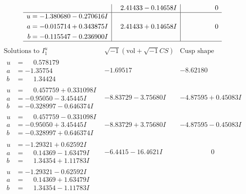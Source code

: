 \documentclass[1p]{elsarticle_modified}
\theoremstyle{definition}
\newcommand{\I}{\sqrt{-1}}
\begin{document}
$$\begin{array}{c|c|c}
 & \phantom{-}2.41433 - 0.14658 I & \phantom{-0.000000 } 0 \\ \hline\begin{aligned}
u &= -1.380680 - 0.270616 I \\
a &= -0.015714 + 0.343875 I \\
b &= -0.115547 - 0.236900 I\end{aligned}
 & \phantom{-}2.41433 + 0.14658 I & \phantom{-0.000000 } 0\\
 \hline 
 \end{array}$$\newpage$$\begin{array}{c|c|c}  
\text{Solutions to }I^u_{1}& \I (\text{vol} + \sqrt{-1}CS) & \text{Cusp shape}\\
 \hline 
\begin{aligned}
u &= \phantom{-}0.578179\phantom{ +0.000000I} \\
a &= -1.35754\phantom{ +0.000000I} \\
b &= \phantom{-}1.34424\phantom{ +0.000000I}\end{aligned}
 & -1.69517\phantom{ +0.000000I} & -8.62180\phantom{ +0.000000I} \\ \hline\begin{aligned}
u &= \phantom{-}0.457759 + 0.331098 I \\
a &= -0.95050 - 3.45445 I \\
b &= -0.328997 - 0.646374 I\end{aligned}
 & -8.83729 - 3.75680 I & -4.87595 + 0.45083 I \\ \hline\begin{aligned}
u &= \phantom{-}0.457759 - 0.331098 I \\
a &= -0.95050 + 3.45445 I \\
b &= -0.328997 + 0.646374 I\end{aligned}
 & -8.83729 + 3.75680 I & -4.87595 - 0.45083 I \\ \hline\begin{aligned}
u &= -1.29321 + 0.62592 I \\
a &= \phantom{-}0.14369 - 1.63479 I \\
b &= \phantom{-}1.34354 + 1.11783 I\end{aligned}
 & -6.4415 - 16.4621 I & \phantom{-0.000000 } 0 \\ \hline\begin{aligned}
u &= -1.29321 - 0.62592 I \\
a &= \phantom{-}0.14369 + 1.63479 I \\
b &= \phantom{-}1.34354 - 1.11783 I\end{aligned}

\end{array}$$
\end{document}
